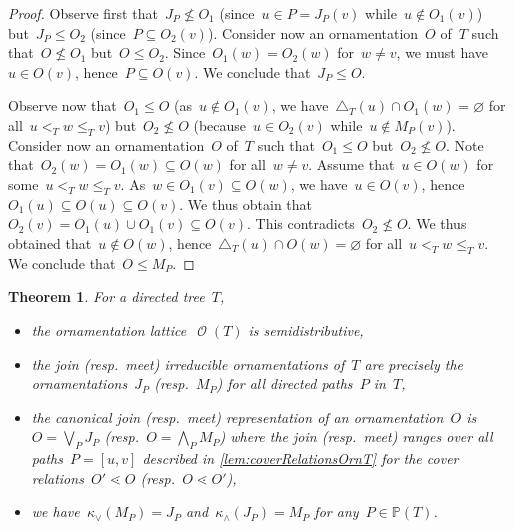 \documentclass{amsart}
\newtheorem{theorem}{Theorem}[section]
\theoremstyle{definition}
\renewcommand{\c}[1]{\mathcal{#1}} %
\newcommand{\vincent}[1]{\todo[size=\tiny,color=blue!30]{ #1 \\ \hfill --- V.}\,}
\newcommand{\meet}{\wedge} %
\newcommand{\join}{\vee} %
\newcommand{\bigMeet}{\bigwedge} %
\newcommand{\bigJoin}{\bigvee} %
\DeclareMathOperator{\Orn}{\c{O}}  %
\newcommand{\PP}{\mathbb P} %
\begin{document}
\begin{proof}
Observe first that~$J_P \not\le O_1$ (since~$u \in P = J_P(v)$ while~$u \notin O_1(v)$) but~$J_P \le O_2$ (since~$P \subseteq O_2(v)$). 
Consider now an ornamentation~$O$ of~$T$ such that~$O \not\le O_1$ but~$O \le O_2$.
Since~$O_1(w) = O_2(w)$ for~$w \ne v$, we must have~$u \in O(v)$, hence~$P \subseteq O(v)$.
We conclude that~$J_P \le O$.

Observe now that~$O_1 \le O$ (as~$u \notin O_1(v)$, we have~$\triangle_T(u) \cap O_1(w) = \varnothing$ for all~$u <_T w \le_T v$) but~$O_2 \not\le O$ (because~$u \in O_2(v)$ while~$u \notin M_P(v)$).
Consider now an ornamentation~$O$ of~$T$ such that~$O_1 \le O$ but~$O_2 \not\le O$.
Note that~$O_2(w) = O_1(w) \subseteq O(w)$ for all~$w \ne v$.
Assume that~$u \in O(w)$ for some~$u <_T w \le_T v$.
As~$w \in O_1(v) \subseteq O(w)$, we have~$u \in O(v)$, hence~$O_1(u) \subseteq O(u) \subseteq O(v)$.
We thus obtain that~$O_2(v) = O_1(u) \cup O_1(v) \subseteq O(v)$.
This contradicts~$O_2 \not\le O$.
We thus obtained that~$u \notin O(w)$, hence~$\triangle_T(u) \cap O(w) = \varnothing$ for all~$u <_T w \le_T v$.
We conclude that~$O \le M_P$.
\end{proof}

\begin{theorem}
\label{thm:OrnSemidistributiveT}
For a directed tree~$T$, 
\begin{itemize}
\item the ornamentation lattice~$\Orn(T)$ is semidistributive,
\item the join (resp.~meet) irreducible ornamentations of~$T$ are precisely the ornamentations~$J_P$ (resp.~$M_P$) for all directed paths~$P$ in~$T$,
\item the canonical join (resp.~meet) representation of an ornamentation~$O$ is~$O = \bigJoin_P J_P$ (resp.~$O = \bigMeet_P M_P$) where the join (resp.~meet) ranges over all paths~$P = [u,v]$ described in \cref{lem:coverRelationsOrnT} for the cover relations~$O' \lessdot O$ (resp.~$O \lessdot O'$), %
\item we have~$\kappa_\join(M_P) = J_P$ and~$\kappa_\meet(J_P) = M_P$ for any~$P \in \PP(T)$.
\end{itemize}
\end{theorem}
\end{document}
